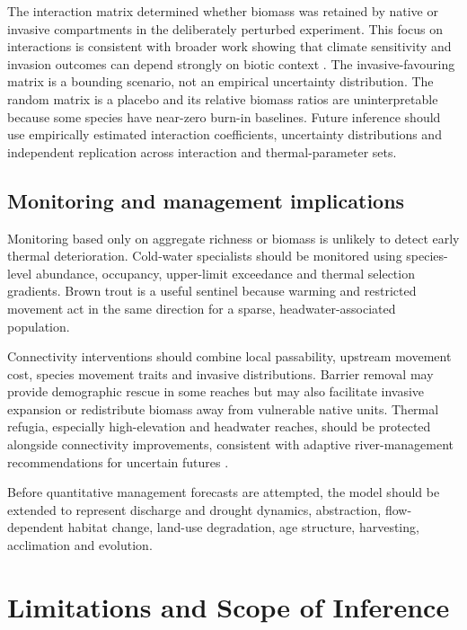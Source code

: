 \documentclass[11pt,a4paper]{article}
\begin{document}
The interaction matrix determined whether biomass was retained by native or invasive compartments in the deliberately perturbed experiment. This focus on interactions is consistent with broader work showing that climate sensitivity and invasion outcomes can depend strongly on biotic context \cite{Carosietal2023}. The invasive-favouring matrix is a bounding scenario, not an empirical uncertainty distribution. The random matrix is a placebo and its relative biomass ratios are uninterpretable because some species have near-zero burn-in baselines. Future inference should use empirically estimated interaction coefficients, uncertainty distributions and independent replication across interaction and thermal-parameter sets.

\subsection{Monitoring and management implications}

Monitoring based only on aggregate richness or biomass is unlikely to detect early thermal deterioration. Cold-water specialists should be monitored using species-level abundance, occupancy, upper-limit exceedance and thermal selection gradients. Brown trout is a useful sentinel because warming and restricted movement act in the same direction for a sparse, headwater-associated population.

Connectivity interventions should combine local passability, upstream movement cost, species movement traits and invasive distributions. Barrier removal may provide demographic rescue in some reaches but may also facilitate invasive expansion or redistribute biomass away from vulnerable native units. Thermal refugia, especially high-elevation and headwater reaches, should be protected alongside connectivity improvements, consistent with adaptive river-management recommendations for uncertain futures \cite{tonkin2018preparing}.

Before quantitative management forecasts are attempted, the model should be extended to represent discharge and drought dynamics, abstraction, flow-dependent habitat change, land-use degradation, age structure, harvesting, acclimation and evolution.

\section{Limitations and Scope of Inference}
\end{document}

